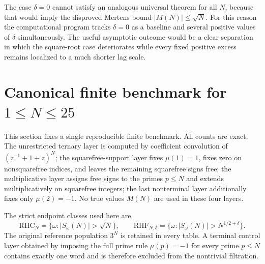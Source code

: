 \documentclass[11pt]{article}
\newcommand{\RHC}{\mathrm{RHC}}
\newcommand{\RHF}{\mathrm{RHF}}
\begin{document}
The case $\delta=0$ cannot satisfy an analogous universal theorem for all $N$, because that would imply the disproved Mertens bound $|M(N)|\le\sqrt N$. For this reason the computational program tracks $\delta=0$ as a baseline and several positive values of $\delta$ simultaneously. The useful asymptotic outcome would be a clear separation in which the square-root case deteriorates while every fixed positive excess remains localized to a much shorter lag scale.

\section{Canonical finite benchmark for $1\le N\le 25$}

This section fixes a single reproducible finite benchmark. All counts are exact. The unrestricted ternary layer is computed by coefficient convolution of $(z^{-1}+1+z)^N$; the squarefree-support layer fixes $\mu(1)=1$, fixes zero on nonsquarefree indices, and leaves the remaining squarefree signs free; the multiplicative layer assigns free signs to the primes $p\le N$ and extends multiplicatively on squarefree integers; the last nonterminal layer additionally fixes only $\mu(2)=-1$. No true values $M(N)$ are used in these four layers.

The strict endpoint classes used here are
\[
 \RHC_N=\{\omega:|S_\omega(N)|>\sqrt N\},
 \qquad
 \RHF_{N,\delta}=\{\omega:|S_\omega(N)|>N^{1/2+\delta}\}.
\]
The original reference population $3^N$ is retained in every table. A terminal control layer obtained by imposing the full prime rule $\mu(p)=-1$ for every prime $p\le N$ contains exactly one word and is therefore excluded from the nontrivial filtration.
\end{document}
